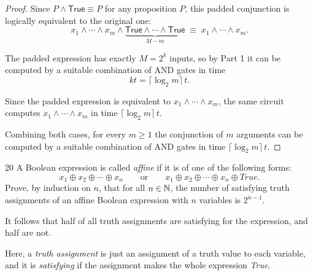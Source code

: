 \documentclass[11pt]{article}
\begin{document}
\begin{proof}
Since $P\wedge\mathsf{True}\equiv P$ for any proposition $P$, this padded conjunction is logically equivalent to the original one:
\[
x_1\wedge\cdots\wedge x_m\wedge\underbrace{\mathsf{True}\wedge\cdots\wedge\mathsf{True}}_{M-m} \;\equiv\; x_1\wedge\cdots\wedge x_m.
\]

The padded expression has exactly $M=2^k$ inputs, so by Part 1 it can be computed by a suitable combination of AND gates in time
\[
kt = \lceil\log_2 m\rceil\, t.
\]

Since the padded expression is equivalent to $x_1\wedge\cdots\wedge x_m$, the same circuit computes $x_1\wedge\cdots\wedge x_m$ in time $\lceil\log_2 m\rceil\, t$.

\bigskip
Combining both cases, for every $m\geq 1$ the conjunction of $m$ arguments can be computed by a suitable combination of AND gates in time $\lceil\log_2 m\rceil\, t$. \qedhere
\end{proof}

\begin{exercise}{20}
    A Boolean expression is called \emph{affine} if it is of one of
    the following forms:
    \[
        x_1 \oplus x_2 \oplus \cdots \oplus x_n
        \qquad\text{or}\qquad
        x_1 \oplus x_2 \oplus \cdots \oplus x_n \oplus \textit{True}.
    \]
    Prove, by induction on $n$, that for all $n \in \mathbb{N}$, the number of
    satisfying truth assignments of an affine Boolean expression with
    $n$ variables is $2^{n-1}$.

    It follows that half of all truth assignments are satisfying for
    the expression, and half are not.

    Here, a \emph{truth assignment} is just an assignment of a truth
    value to each variable, and it is \emph{satisfying} if the
    assignment makes the whole expression \textit{True}.
\end{exercise}
\end{document}

